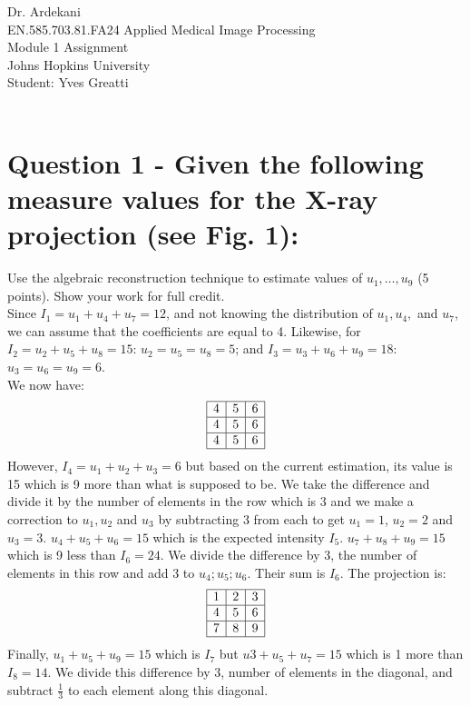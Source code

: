 \documentclass[12pt,twoside]{article}
\begin{document}
\noindent Dr. Ardekani\\
EN.585.703.81.FA24 Applied Medical Image Processing\\
Module 1 Assignment\\
Johns Hopkins University\\
Student: Yves Greatti\\\


\section*{Question 1 - Given the following measure values for the X-ray projection (see Fig. 1):}
\be
    \item Use the algebraic reconstruction technique to estimate values of \( u_1, \ldots, u_9 \) (5 points). Show your work for full credit.\\
    Since \( I_1 = u_1 + u_4 + u_7 = 12 \), and not knowing the distribution of \( u_1, u_4, \) and \( u_7 \), 
    we can assume that the coefficients are equal to 4. Likewise, for \( I_2 = u_2 + u_5 + u_8 = 15 \): \( u_2=u_5=u_8=5 \); and  \( I_3 = u_3+ u_6 + u_9 = 18 \): \( u_3=u_6=u_9=6 \). \\
  We now have:\\
  \[
\begin{array}{|c|c|c|}
\hline
4 & 5 & 6 \\
\hline
4 & 5 & 6 \\
\hline
4 & 5 & 6 \\
\hline
\end{array}
\]
However,  \( I_4 = u_1 + u_2+ u_3 = 6 \) but based on the current estimation, its value is 15 which is 9 more than what is supposed to be.  We take the difference and divide it by the number of elements in the row 
which is 3 and we make a correction to \( u_1, u_2 \) and \(u_3\) by subtracting 3 from each to get $u_1=1$, $u_2=2$ and $u_3=3$. 
$u_4 + u_5 + u_6 = 15$ which is the expected intensity $I_5$.  
$u_7+ u_8 + u_9 = 15$ which is 9 less than $I_6=24$. We divide the difference by 3, the number of elements in this row and add 3 to $u_4; u_5 ; u_6 $.
Their sum is $I_6$. The projection is:
 \[
\begin{array}{|c|c|c|}
\hline
1 & 2 & 3 \\
\hline
4 & 5 & 6 \\
\hline
7 & 8 & 9 \\
\hline
\end{array}
\]
Finally, $u_1+ u_5 + u_9 = 15$ which is $I_7$ but $u3 + u_5 + u_7 = 15$ which is 1 more than $I_8=14$. 
We  divide this difference by 3, number of elements in the diagonal, and subtract $\frac{1}{3}$ to each element along this diagonal.
\end{document}
